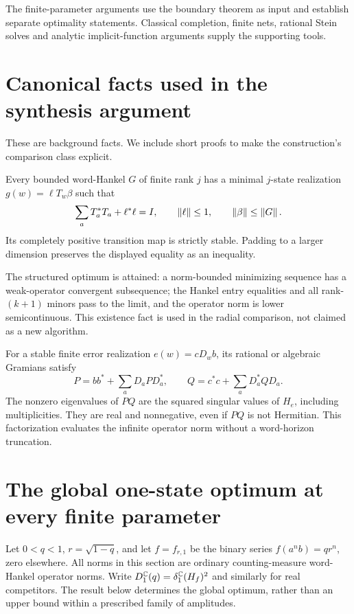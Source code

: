 The finite-parameter arguments use the boundary theorem as input and establish separate optimality statements. Classical completion, finite nets, rational Stein solves and analytic implicit-function arguments supply the supporting tools.

\section{Canonical facts used in the synthesis argument}
These are background facts. We include short proofs to make the construction's comparison class explicit.

\begin{lemma}\label{I:F:lem:canonical-input}
Every bounded word-Hankel $G$ of finite rank $j$ has a minimal $j$-state realization $g(w)=\ell T_w\beta$ such that
\[
\sum_a T_a^*T_a+\ell^*\ell=I,\qquad \left\lVert\ell\right\rVert\le1,
\qquad\left\lVert\beta\right\rVert\le\left\lVert G\right\rVert.
\]
Its completely positive transition map is strictly stable. Padding to a larger dimension preserves the displayed equality as an inequality.
\end{lemma}


The structured optimum is attained: a norm-bounded minimizing sequence has a weak-operator convergent subsequence; the Hankel entry equalities and all rank-$(k+1)$ minors pass to the limit, and the operator norm is lower semicontinuous. This existence fact is used in the radial comparison, not claimed as a new algorithm.

For a stable finite error realization $e(w)=cD_wb$, its rational or algebraic Gramians satisfy
\[
P=bb^*+\sum_aD_aPD_a^*,\qquad
Q=c^*c+\sum_aD_a^*QD_a.
\]
The nonzero eigenvalues of $PQ$ are the squared singular values of $H_e$, including multiplicities. They are real and nonnegative, even if $PQ$ is not Hermitian. This factorization evaluates the infinite operator norm without a word-horizon truncation.

\section{The global one-state optimum at every finite parameter}
\label{I:F:sec:F1}

Let $0<q<1$, $r=\sqrt{1-q}$, and let $f=f_{r,1}$ be the binary
series $f(a^n b)=qr^n$, zero elsewhere. All norms in this section are
ordinary counting-measure word-Hankel operator norms. Write
$D_1^{\mathbb C}(q)=\delta_1^{\mathbb C}(H_f)^2$ and similarly for real competitors.
The result below determines the global optimum, rather than an upper
bound within a prescribed family of amplitudes.

